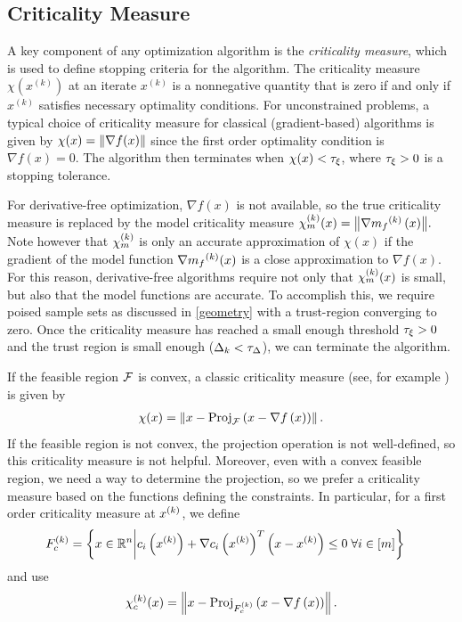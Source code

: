 \documentclass{article}
\begin{document}
\subsection{Criticality Measure}

\label{criticality_measure_section}
\label{criticallity_measure_section}

A key component of any optimization algorithm is the {\em criticality measure}, which is used to define stopping criteria for the algorithm.
The criticality measure $\chi(x^{(k)})$ at an iterate $x^{(k)}$ is a nonnegative quantity that is zero if and only if $x^{(k)}$ satisfies necessary optimality conditions.
For unconstrained problems,  a typical choice of criticality measure for classical (gradient-based) algorithms is given by $\chi(x) = {\left\|\nabla f(x)\right\|}$
since the first order optimality condition is $\nabla f(x)=0$.
The algorithm then terminates when $\chi(x) < \tau_{\xi}$, where $\tau_{\xi} >0$ is a stopping tolerance.

For derivative-free optimization,  $\nabla f(x)$ is not available,  so the true criticality measure is replaced by the model criticality measure
${\chi_m^{(k)}}(x) = {\left\|\nabla {{m}_f}^{(k)}\left(x\right)\right\|}.$
Note however that ${\chi_m^{(k)}}$ is only an accurate approximation of $\chi(x)$ if the gradient of the model function $\nabla {{m}_f}^{(k)}(x)$ is a close approximation to $\nabla f(x)$.
For this reason, derivative-free algorithms require not only that ${\chi_m^{(k)}}(x)$ is small, but also that the model functions are accurate.
To accomplish this, we require poised sample sets as discussed in \cref{geometry} with a trust-region converging to zero.
Once the criticality measure has reached a small enough threshold $\tau_{\xi} > 0$ and the trust region is small enough ($\Delta_k < \tau_{\Delta}$),
we can terminate the algorithm.



If the feasible region ${\mathcal F}$ is convex, a classic criticality measure (see, for example \cite{Conejo:2013:GCT:2620806.2621814} \cite{Conn:2000:TM:357813}) is given by
\begin{align*}
\chi(x) = \left\|x - {\textrm{Proj}}_{{\mathcal F}}\left(x- \nabla f\left(x\right)\right)\right\|.
\end{align*}
If the feasible region is not convex, the projection operation is not well-defined, so this criticality measure is not helpful.
Moreover,  even with a convex feasible region, we need a way to determine the projection, so we prefer a criticality measure based on the  functions defining the constraints.   In particular, for
a first order criticality measure at $x^{(k)}$, we define
\begin{align}
{F_c^{(k)}} &= \left\{ x \in \mathbb R^n \bigg| c_i\left(x^{(k)}\right) + \nabla c_i\left(x^{(k)}\right)^T \left(x - x^{(k)}\right) \le 0 \; \forall i \in [m] \right\} \label{define_truefeasiblek}
\end{align}
and use
\begin{align}
\chi_c^{(k)}(x) = \left\|x - {\textrm{Proj}}_{{F_c^{(k)}}}\left(x- \nabla f\left(x\right)\right)\right\|. \label{define_true_criticality}
\end{align}
\end{document}
